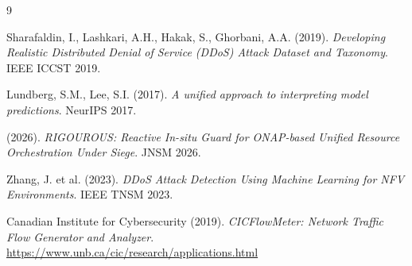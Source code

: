 \documentclass[12pt,a4paper]{article}
\begin{document}
\begin{thebibliography}{9}

Sharafaldin, I., Lashkari, A.H., Hakak, S., Ghorbani, A.A. (2019).
\textit{Developing Realistic Distributed Denial of Service (DDoS) Attack Dataset and Taxonomy}.
IEEE ICCST 2019.

Lundberg, S.M., Lee, S.I. (2017).
\textit{A unified approach to interpreting model predictions}.
NeurIPS 2017.

(2026).
\textit{RIGOUROUS: Reactive In-situ Guard for ONAP-based Unified Resource Orchestration Under Siege}.
JNSM 2026.

Zhang, J. et al. (2023).
\textit{DDoS Attack Detection Using Machine Learning for NFV Environments}.
IEEE TNSM 2023.

Canadian Institute for Cybersecurity (2019).
\textit{CICFlowMeter: Network Traffic Flow Generator and Analyzer}.
\url{https://www.unb.ca/cic/research/applications.html}

\end{thebibliography}
\end{document}
